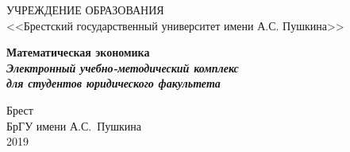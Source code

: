 \documentclass[12pt, 4paper]{book}
\begin{document}
	\begin{center}
  		УЧРЕЖДЕНИЕ ОБРАЗОВАНИЯ\\
  		<<Брестский государственный университет имени А.С. Пушкина>>
	\end{center}
	\vspace{35mm}%
	\begin{center}
		\textbf
		{%
     		{\LARGE \color{blue} Математическая экономика}\\[10mm]
       		{\it\Large Электронный учебно-методический комплекс }\\
    		{\it\Large для студентов юридического факультета}
		}
	\end{center}%
	\vspace{30mm}
	\begin{center}
		Брест\\%
		БрГУ имени А.С.~Пушкина\\%
  		2019%
	\end{center}
\newpage	%
\end{document}
